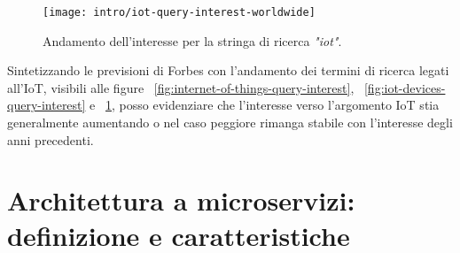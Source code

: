 \begin{figure}[H]
    \centering
    \texttt{[image: intro/iot-query-interest-worldwide]}
    \caption{Andamento dell'interesse per la stringa di ricerca \textit{"iot"}. \\ \cite{site:iot-short-trend}}
    \label{fig:iot-query-interest}
\end{figure}

Sintetizzando le previsioni di Forbes con l'andamento dei termini di ricerca legati all'IoT, visibili alle figure ~\ref{fig:internet-of-things-query-interest}, ~\ref{fig:iot-devices-query-interest} e ~\ref{fig:iot-query-interest}, posso evidenziare che l'interesse verso l'argomento IoT stia generalmente aumentando o nel caso peggiore rimanga stabile con l'interesse degli anni precedenti.

\section{Architettura a microservizi: definizione e caratteristiche}
\label{intro:arch}

